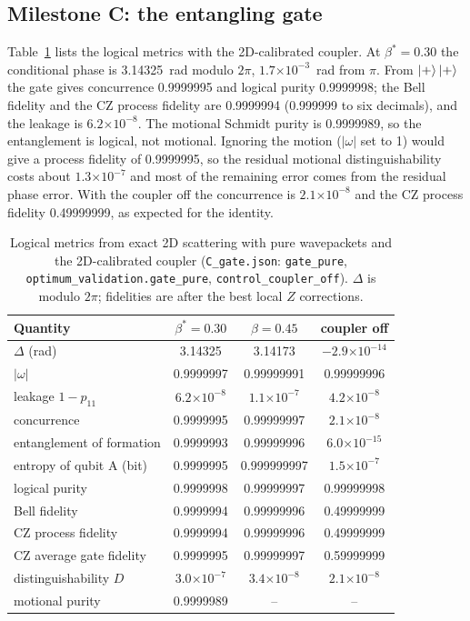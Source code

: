 \documentclass[10pt,twocolumn,letterpaper]{article}
\newcommand{\ee}[1]{\ensuremath{\times10^{#1}}}
\newcommand{\file}[1]{\texttt{#1}}
\begin{document}
\subsection{Milestone C: the entangling gate}
\label{sec:resC}
Table~\ref{tab:gate} lists the logical metrics with the 2D-calibrated coupler. At $\beta^*=0.30$ the conditional phase
is 3.14325~rad modulo $2\pi$, $1.7\ee{-3}$~rad from $\pi$. From $\ket{+}\ket{+}$ the gate gives concurrence 0.9999995
and logical purity 0.9999998; the Bell fidelity and the CZ process fidelity are 0.9999994 (0.999999 to six decimals),
and the leakage is $6.2\ee{-8}$. The motional Schmidt purity is 0.9999989, so the entanglement is logical, not motional.
Ignoring the motion ($|\omega|$ set to 1) would give a process fidelity of 0.9999995, so the residual motional
distinguishability costs about $1.3\ee{-7}$ and most of the remaining error comes from the residual phase error. With
the coupler off the concurrence is $2.1\ee{-8}$ and the CZ process fidelity 0.49999999, as expected for the identity.

\begin{table}[t]
\centering\footnotesize
\caption{Logical metrics from exact 2D scattering with pure wavepackets and the 2D-calibrated coupler
(\file{C\_\allowbreak{}gate.\allowbreak{}json}: \file{gate\_\allowbreak{}pure}, \file{optimum\_\allowbreak{}validation.\allowbreak{}gate\_\allowbreak{}pure}, \file{control\_\allowbreak{}coupler\_\allowbreak{}off}). $\Delta$
is modulo $2\pi$; fidelities are after the best local $Z$ corrections.}
\label{tab:gate}
\setlength{\tabcolsep}{3.4pt}
\begin{tabular}{@{}lccc@{}}
\toprule
Quantity & $\beta^*=0.30$ & $\beta=0.45$ & coupler off\\
\midrule
$\Delta$ (rad) & 3.14325 & 3.14173 & $-2.9\ee{-14}$\\
$|\omega|$ & 0.9999997 & 0.99999991 & 0.99999996\\
leakage $1-p_{11}$ & $6.2\ee{-8}$ & $1.1\ee{-7}$ & $4.2\ee{-8}$\\
concurrence & 0.9999995 & 0.99999997 & $2.1\ee{-8}$\\
entanglement of formation & 0.9999993 & 0.99999996 & $6.0\ee{-15}$\\
entropy of qubit A (bit) & 0.9999995 & 0.999999997 & $1.5\ee{-7}$\\
logical purity & 0.9999998 & 0.99999997 & 0.99999998\\
Bell fidelity & 0.9999994 & 0.99999996 & 0.49999999\\
CZ process fidelity & 0.9999994 & 0.99999996 & 0.49999999\\
CZ average gate fidelity & 0.9999995 & 0.99999997 & 0.59999999\\
distinguishability $D$ & $3.0\ee{-7}$ & $3.4\ee{-8}$ & $2.1\ee{-8}$\\
motional purity & 0.9999989 & -- & --\\
\bottomrule
\end{tabular}
\end{table}
\end{document}
